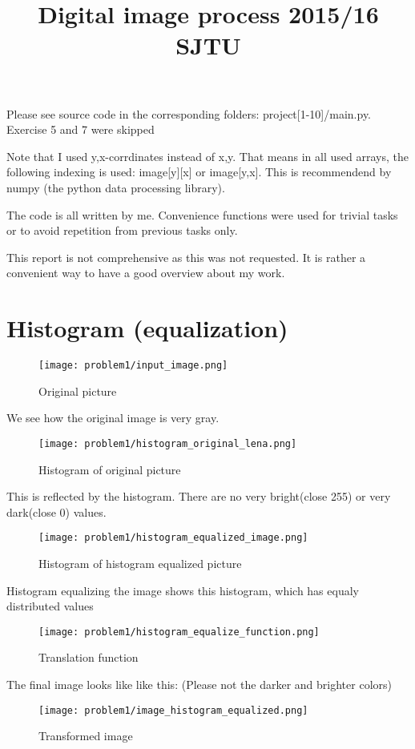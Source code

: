 \documentclass[a4paper]{scrartcl}
\title{Digital image process 2015/16 SJTU}
\begin{document}
\maketitle

Please see source code in the corresponding folders: project[1-10]/main.py.
Exercise 5 and 7 were skipped

Note that I used y,x-corrdinates instead of x,y. That means in all used arrays, the following indexing is used: image[y][x] or image[y,x]. This is recommendend by numpy (the python data processing library).

The code is all written by me. Convenience functions were used for trivial tasks or to avoid repetition from previous tasks only.

This report is not comprehensive as this was not requested. It is rather a convenient way to have a good overview about my work.

\section{Histogram (equalization)}
\begin{figure}[h]
  \centering
  \texttt{[image: problem1/input\_image.png]}
  \caption{Original picture}
\end{figure}
We see how the original image is very gray.
\begin{figure}[h]
  \centering
  \texttt{[image: problem1/histogram\_original\_lena.png]}
  \caption{Histogram of original picture}
\end{figure}
This is reflected by the histogram. There are no very bright(close 255) or very dark(close 0) values.
\begin{figure}[h]
  \centering
  \texttt{[image: problem1/histogram\_equalized\_image.png]}
  \caption{Histogram of histogram equalized picture}
\end{figure}
Histogram equalizing the image shows this histogram, which has equaly distributed values
\begin{figure}[h]
  \centering
  \texttt{[image: problem1/histogram\_equalize\_function.png]}
  \caption{Translation function}
\end{figure}
The final image looks like like this: (Please not the darker and brighter colors)
\begin{figure}[h]
  \centering
  \texttt{[image: problem1/image\_histogram\_equalized.png]}
  \caption{Transformed image}
\end{figure}
\end{document}

